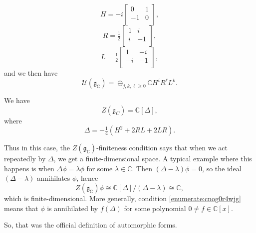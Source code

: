 \documentclass[reqno]{amsart} 
\begin{document}
\begin{equation*}
  H = - i
  \begin{bmatrix}
    0    & 1 \\
    -1 & 0 \\
  \end{bmatrix},
\end{equation*}
\begin{equation*}
  R = \tfrac{1}{2}
  \begin{bmatrix}
    1    & i \\
    i & -1 \\
  \end{bmatrix},
\end{equation*}
\begin{equation*}
  L = \tfrac{1}{2}
  \begin{bmatrix}
    1    & -i \\
    -i & -1 \\
  \end{bmatrix},
\end{equation*}
and we then have
\begin{equation*}
  \mathcal{U}(\mathfrak{g}_{\mathbb{C}})
  = \oplus_{ j, k, \ell  \geq 0}
  \mathbb{C}  H^i R^{\ell} L^k .
\end{equation*}
\begin{theorem}
  We have
  \begin{equation*}
    Z(\mathfrak{g}_C) = \mathbb{C}[\Delta],
  \end{equation*}
  where
  \begin{equation*}
    \Delta = - \tfrac{1}{4} \left( H^2 + 2 R L + 2 L R \right).
  \end{equation*}
\end{theorem}
Thus in this case, the $Z(\mathfrak{g}_{\mathbb{C}})$-finiteness condition says that when we act repeatedly by $\Delta$, we get a finite-dimensional space.  A typical example where this happens is when $\Delta \phi = \lambda \phi$ for some $\lambda \in \mathbb{C}$.  Then $(\Delta - \lambda) \phi = 0$, so the ideal $(\Delta - \lambda)$ annihilates $\phi$, hence
\begin{equation*}
  Z(\mathfrak{g}_{\mathbb{C}}) \phi \cong
  \mathbb{C}[\Delta] /(\Delta - \lambda) \cong \mathbb{C},  
\end{equation*}
which is finite-dimensional.  More generally, condition \eqref{enumerate:cnog0r4wjg} means that $\phi$ is annihilated by $f(\Delta)$ for some  polynomial $0 \neq f \in \mathbb{C}[x]$.

So, that was the official definition of automorphic forms.
\end{document}

